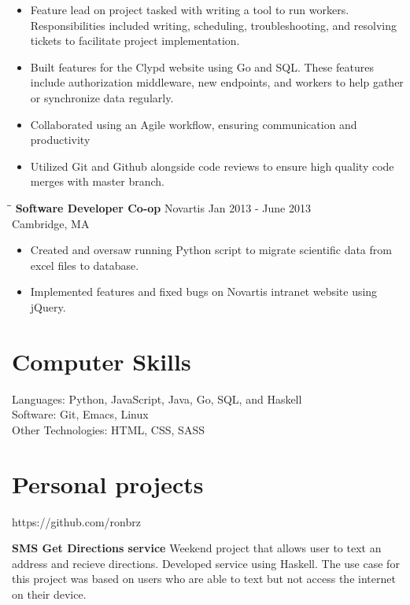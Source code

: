 \documentclass{res}
\begin{document}
\begin{resume}
\begin{itemize}[leftmargin= .1in]
\item Feature lead on project tasked with writing a tool to run workers. Responsibilities
  included writing, scheduling, troubleshooting, and resolving tickets to facilitate project
  implementation.
\item Built features for the Clypd website using Go and SQL. These features include
  authorization middleware, new endpoints, and workers to help gather or synchronize data
  regularly.
\item Collaborated using an Agile workflow, ensuring communication and productivity
\item Utilized Git and Github alongside code reviews to ensure high quality code merges with
  master branch.
\end{itemize}
\vspace{-.2in}
   \begin{tabbing}
   \hspace{2.3in}\= \hspace{2.6in}\= \kill %
    {\bf Software Developer Co-op} \>Novartis \> Jan 2013 - June 2013\\
    \>Cambridge, MA
   \end{tabbing}%
   \begin{itemize}[leftmargin= .1in] \itemsep -2pt
   \item Created and oversaw running Python script to migrate scientific data from excel files
     to database.
   \item Implemented features and fixed bugs on Novartis intranet website using jQuery.
   \end{itemize}
\vspace{-.2in}
\section{Computer Skills}
Languages:  Python, JavaScript, Java, Go, SQL, and Haskell \\
Software: Git, Emacs, Linux  \\
Other Technologies:  HTML, CSS,  SASS
\section{Personal projects}
        \centerline{https://github.com/ronbrz}\vspace{-.1in} 
        {\bf SMS Get Directions service} Weekend project that allows user to text an address
        and recieve directions. Developed service using Haskell. The use case for this project
        was based on users who are able to text but not access the internet on their device. \\


\end{resume}
\end{document}

